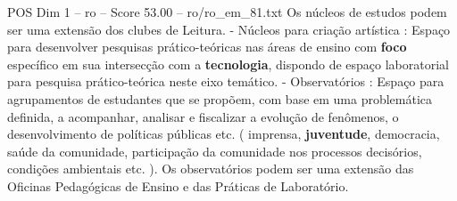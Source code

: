 \begin{textsample}{POS Dim 1 – ro – Score 53.00 – ro/ro\_em\_81.txt}
Os núcleos de estudos podem ser uma extensão dos clubes de Leitura. - Núcleos para criação artística : Espaço para desenvolver pesquisas prático-teóricas nas áreas de ensino com \textbf{foco} específico em sua intersecção com a \textbf{tecnologia}, dispondo de espaço laboratorial para pesquisa prático-teórica neste eixo temático. - Observatórios : Espaço para agrupamentos de estudantes que se propõem, com base em uma problemática definida, a acompanhar, analisar e fiscalizar a evolução de fenômenos, o desenvolvimento de políticas públicas etc. ( imprensa, \textbf{juventude}, democracia, saúde da comunidade, participação da comunidade nos processos decisórios, condições ambientais etc. ).
Os observatórios podem ser uma extensão das Oficinas Pedagógicas de Ensino e das Práticas de Laboratório.

\end{textsample}
